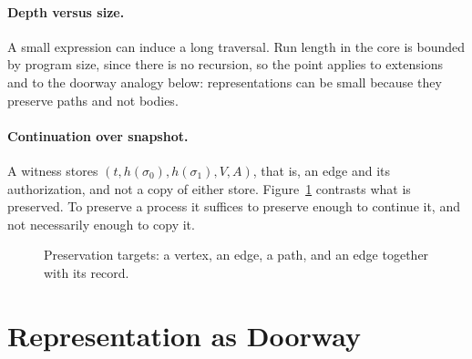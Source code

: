 \documentclass[11pt]{article}
\newcommand{\hash}{h}
\begin{document}
\paragraph{Depth versus size.} A small expression can induce a long traversal. Run length in the core is bounded by program size, since there is no recursion, so the point applies to extensions and to the doorway analogy below: representations can be small because they preserve paths and not bodies.

\paragraph{Continuation over snapshot.} A witness stores $(t,\hash(\sigma_0),\hash(\sigma_1),V,A)$, that is, an edge and its authorization, and not a copy of either store. Figure~\ref{f:cont} contrasts what is preserved. To preserve a process it suffices to preserve enough to continue it, and not necessarily enough to copy it.

\begin{figure}[h]
\centering
{}
\caption{Preservation targets: a vertex, an edge, a path, and an edge together with its record.}
\label{f:cont}
\end{figure}

\section{Representation as Doorway}\label{s:door}
\end{document}
